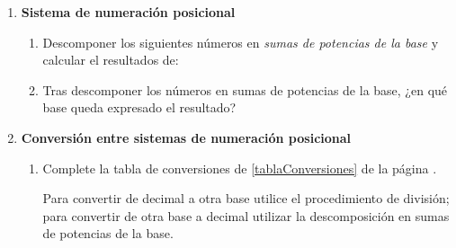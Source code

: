 \documentclass[12pt]{article}
\begin{document}
\begin{enumerate}
\begin{enumerate}

    \end{enumerate}

    \item \textbf{Sistema de numeración posicional}

        \begin{enumerate}

            \item Descomponer los siguientes números en \emph{sumas de potencias
                de la base} y calcular el resultados de:


            \item Tras descomponer los números en sumas de potencias de la
                base, ¿en qué base queda expresado el resultado?

        \end{enumerate}

    \item \textbf{Conversión entre sistemas de numeración posicional}

    \begin{enumerate}

        \item Complete la tabla de conversiones de \ref{tablaConversiones} de
            la página \pageref{tablaConversiones}. \label{ejTabla}

            Para convertir de decimal a otra base utilice el procedimiento de
            división; para convertir de otra base a decimal utilizar la
            descomposición en sumas de potencias de la base.


\end{enumerate}
\end{enumerate}
\end{document}
